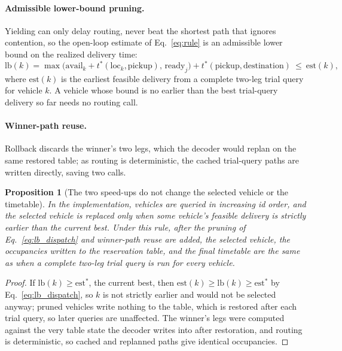 \documentclass[manuscript,screen,review]{acmart}
\newtheorem{prop}{Proposition}
\begin{document}
\paragraph{Admissible lower-bound pruning.}
Yielding can only delay routing, never beat the shortest path that ignores contention, so the open-loop estimate of Eq.~\eqref{eq:rule} is an admissible lower bound on the realized delivery time:
\begin{equation}
\label{eq:lb_dispatch}
\mathrm{lb}(k)=\max\bigl(\mathrm{avail}_k+t^{*}(\mathrm{loc}_k,\text{pickup}),\,
\mathrm{ready}_j\bigr)+t^{*}(\text{pickup},\text{destination})\ \le\ \mathrm{est}(k),
\end{equation}
where $\mathrm{est}(k)$ is the earliest feasible delivery from a complete two-leg trial query for vehicle $k$.
A vehicle whose bound is no earlier than the best trial-query delivery so far needs no routing call.

\paragraph{Winner-path reuse.}
Rollback discards the winner's two legs, which the decoder would replan on the same restored table; as routing is deterministic, the cached trial-query paths are written directly, saving two calls.

\begin{prop}[The two speed-ups do not change the selected vehicle or the timetable]
  \label{prop:speedup_equiv}
  In the implementation, vehicles are queried in increasing id order, and the selected vehicle is replaced only when some vehicle's feasible delivery is strictly earlier than the current best.
  Under this rule, after the pruning of Eq.~\eqref{eq:lb_dispatch} and winner-path reuse are added, the selected vehicle, the occupancies written to the reservation table, and the final timetable are the same as when a complete two-leg trial query is run for every vehicle.
\end{prop}

\begin{proof}
If $\mathrm{lb}(k)\ge\mathrm{est}^{\ast}$, the current best, then $\mathrm{est}(k)\ge\mathrm{lb}(k)\ge\mathrm{est}^{\ast}$ by Eq.~\eqref{eq:lb_dispatch}, so $k$ is not strictly earlier and would not be selected anyway; pruned vehicles write nothing to the table, which is restored after each trial query, so later queries are unaffected.
The winner's legs were computed against the very table state the decoder writes into after restoration, and routing is deterministic, so cached and replanned paths give identical occupancies.
\end{proof}
\end{document}
